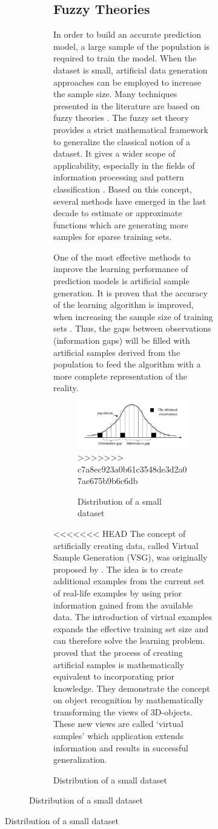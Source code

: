 \documentclass[parskip=full]{scrartcl}
\begin{document}
\begin{figure}[h]
\begin{figure}[h]
\begin{figure}[h]
\subsection{Fuzzy Theories}
In order to build an accurate prediction model, a large sample of the population
is required to train the model. When the dataset is small, artificial data
generation approaches can be employed to increase the sample size.  Many
techniques presented in the literature are based on fuzzy theories
\cite{AbdulLateh.2017}. The fuzzy set theory provides a strict mathematical
framework to generalize the classical notion of a dataset. It gives a wider
scope of applicability, especially in the fields of information processing and
pattern classification \cite{Zimmermann.2010}. Based on this concept, several
methods have emerged in the last decade to estimate or approximate functions
which are generating more samples for sparse training sets.

One of the most effective methods to improve the learning performance of
prediction models is artificial sample generation. It is proven that the
accuracy of the learning algorithm is improved, when increasing the sample size
of training sets \cite{AbdulLateh.2017}. Thus, the gaps between observations
(information gaps) will be filled with artificial samples derived from the
population to feed the algorithm with a more complete representation of the
reality.

\begin{figure}[h]
	\centering
	\includegraphics[width=0.6\linewidth]{"./Resources/Small data distribution"}
>>>>>>> c7a8ec923a0b61c3548de3d2a07ae675b9b6c6db
	\caption{Distribution of a small dataset}
	\label{fig:small-data-distribution}
\end{figure}

<<<<<<< HEAD
The concept of artificially creating data, called Virtual Sample Generation (VSG), was originally proposed by \cite{Niyogi.1998}. The idea is to create additional examples from the current set of real-life examples by using prior information gained from the available data. The introduction of virtual examples expands the effective training set size and can therefore solve the learning problem. \cite{Niyogi.1998} proved that the process of creating artificial samples is mathematically equivalent to incorporating prior knowledge. They demonstrate the concept on object recognition by mathematically transforming the views of 3D-objects. These new views are called ‘virtual samples’ which application extends information and results in successful generalization. 


\end{figure}
\end{figure}
\end{figure}
\end{document}
